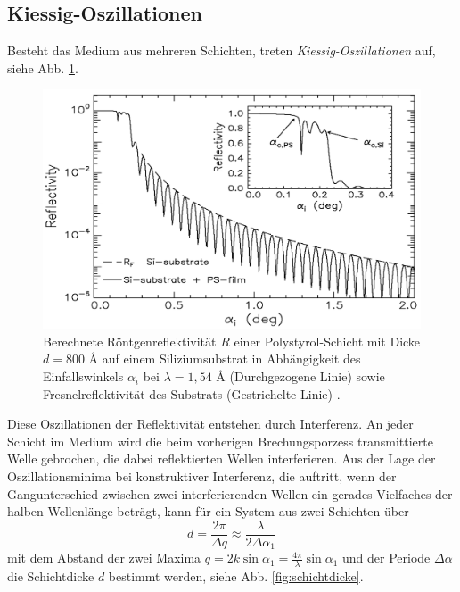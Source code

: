 \subsection*{Kiessig-Oszillationen}
Besteht das Medium aus mehreren Schichten, treten \textit{Kiessig-Oszillationen} auf, siehe Abb. \ref{fig:kiessig}. 
\begin{figure}
    \centering
    \includegraphics[width = \linewidth]{kiessig.png}
    \caption{Berechnete Röntgenreflektivität $R$ einer Polystyrol-Schicht mit Dicke $d = 800$ Å auf einem Siliziumsubstrat in 
    Abhängigkeit des Einfallswinkels $\alpha_i$ bei $\lambda = 1,54$ Å (Durchgezogene Linie) sowie 
    Fresnelreflektivität des Substrats (Gestrichelte Linie) \cite{kiessig}.}
    \label{fig:kiessig}
\end{figure}
Diese Oszillationen der Reflektivität entstehen durch Interferenz. An jeder Schicht im Medium wird die 
beim vorherigen Brechungsporzess transmittierte Welle gebrochen, die dabei reflektierten Wellen 
interferieren. Aus der Lage der Oszillationsminima bei konstruktiver Interferenz, die auftritt, wenn der 
Gangunterschied zwischen zwei interferierenden Wellen
ein gerades Vielfaches der halben Wellenlänge beträgt, kann für ein System aus zwei Schichten über
\begin{equation*}
    d = \frac{2 \pi}{\Delta q} \approx \frac{\lambda}{2 \Delta \alpha_1}
\end{equation*} 
mit dem Abstand der zwei Maxima $q = 2 k \sin \alpha_1 = \frac{4 \pi}{\lambda} \sin \alpha_1$
und der Periode $\Delta \alpha$ die Schichtdicke $d$ bestimmt werden, siehe Abb. \ref{fig:schichtdicke}.
